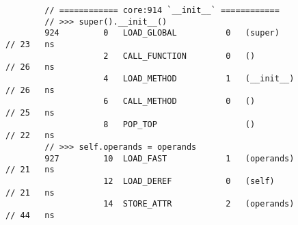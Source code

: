 \begin{code}
\begin{verbatim}
        // ============ core:914 `__init__` ============
        // >>> super().__init__()
        924         0   LOAD_GLOBAL          0   (super)                                            // 23   ns
                    2   CALL_FUNCTION        0   ()                                                 // 26   ns
                    4   LOAD_METHOD          1   (__init__)                                         // 26   ns
                    6   CALL_METHOD          0   ()                                                 // 25   ns
                    8   POP_TOP                  ()                                                 // 22   ns
        // >>> self.operands = operands
        927         10  LOAD_FAST            1   (operands)                                         // 21   ns
                    12  LOAD_DEREF           0   (self)                                             // 21   ns
                    14  STORE_ATTR           2   (operands)                                         // 44   ns


\end{verbatim}
\end{code}
